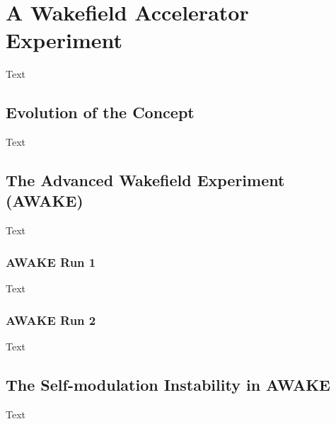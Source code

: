 %
%

\chapter{A Wakefield Accelerator Experiment}
\label{Ch:WFA}

Text

\section{Evolution of the Concept}
\label{WFA:History}

Text

\section{The Advanced Wakefield Experiment (AWAKE)}
\label{WFA:AWAKE}

Text

\subsection{AWAKE Run 1}
\label{WFA:AWAKE:R1}

Text

\subsection{AWAKE Run 2}
\label{WFA:AWAKE:R2}

Text

\section{The Self-modulation Instability in AWAKE}
\label{WFA:SMI}

Text

